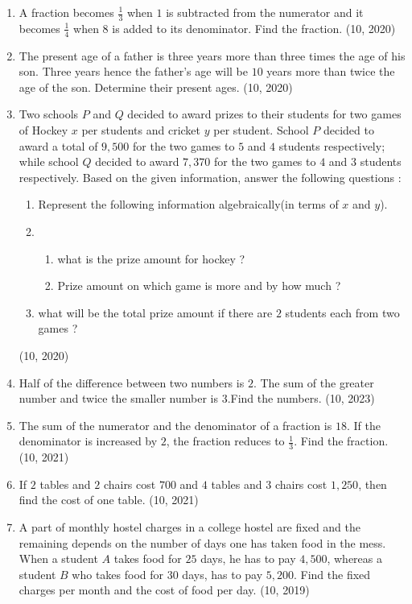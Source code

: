 \begin{enumerate}[label=\thesubsection.\arabic*, ref=\thesubsection.\theenumi]
\item A fraction becomes $\frac{1}{3}$ when $1$ is subtracted from the numerator and it becomes $\frac{1}{4}$ when $8$ is added to its denominator. Find the fraction.
\hfill (10, 2020)
\item The present age of a father is three years more than three times the age of his son. Three years hence the father's age will be $10$ years more than twice the age of the son. Determine their present ages.
\hfill (10, 2020)
\item Two schools $P$ and $Q$ decided to award prizes to their students for two games of Hockey \rupee $x$ per students and cricket \rupee $y$ per student. School $P$
decided to award a total of \rupee $9,500$ for the two games to $5$ and $4$ students respectively; while school $Q$ decided to award \rupee $7,370$ for the two games to $4$ and $3$ students respectively.
Based on the given information, answer the following questions :
\begin{enumerate}
    \item Represent the following information algebraically(in terms of $x$ and $y$).
    \item\begin{enumerate}
\item what is the prize amount for hockey ?
\item Prize amount on which game is more and by how much ?
    \end{enumerate}
    \item what will be the total prize amount if there are $2$ students each from two games ?
\end{enumerate}
\hfill (10, 2020)
\item Half of the difference between two numbers is $2$. The sum of the greater number and twice the smaller number is $3$.Find the numbers.
\hfill (10, 2023)
    \item The sum of the numerator and the denominator of a fraction is $18$. If the denominator is increased by $2$, the fraction reduces to $\frac{1}{3}$. Find the fraction.
\hfill (10, 2021)
    \item If $2$ tables and $2$ chairs cost \rupee $700$ and $4$ tables and $3$ chairs cost \rupee $1,250$, then find the cost of one table.
\hfill (10, 2021)
\item A part of monthly hostel charges in a college hostel are fixed and the remaining depends on the number of days one has taken food in the mess. When a student $A$ takes food for $25$ days, he has to pay {\rupee $4,500$}, whereas a student $B$ who takes food for $30$ days, has to pay {\rupee $5,200$}. Find the fixed charges per month and the cost of food per day.
\hfill (10, 2019)



\end{enumerate}
